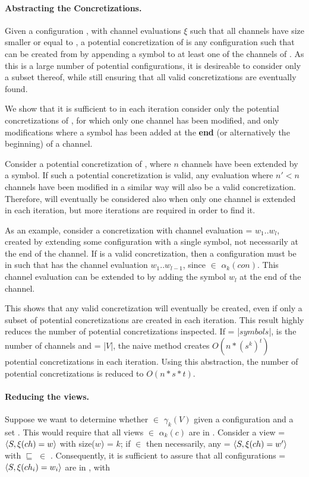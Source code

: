 \paragraph{Abstracting the Concretizations.}
Given a configuration , with channel evaluations $\xi$ such that all channels have size smaller or equal to , a potential concretization of  is any configuration  such that  can be created from  by appending a symbol to at least one of the channels of . As this is a large number of potential configurations, it is desireable to consider only a subset thereof, while still ensuring that all valid concretizations are eventually found.

We show that it is sufficient to in each iteration consider only the potential concretizations of , for which only one channel has been modified, and only modifications where a symbol has been added at the \textbf{end} (or alternatively the beginning) of a channel.

Consider a potential concretization  of , where $n$ channels have been extended by a symbol. If such a potential concretization is valid, any evaluation where $n'<n$ channels have been modified in a similar way will also be a valid concretization. Therefore,  will eventually be considered also when only one channel is extended in each iteration, but more iterations are required in order to find it.

As an example, consider a concretization with channel evaluation  = $w_1..w_l$, created by extending some configuration with a single symbol, not necessarily at the end of the channel. If  is a valid concretization, then a configuration  must be in  such that  has the channel evaluation $w_1..w_{l-1}$, since  $\in$ $\alpha_k(con)$. This channel evaluation can be extended to  by adding the symbol $w_l$ at the end of the channel.

This shows that any valid concretization will eventually be created, even if only a subset of potential concretizations are created in each iteration. This result highly reduces the number of potential concretizations inspected. If  = |$symbols$|,  is the number of channels and  = |$V$|, the naive method creates $O(n*(s^k)^t)$ potential concretizations in each iteration. Using this abstraction, the number of potential concretizations is reduced to $O(n*s*t)$.

\paragraph{Reducing the views.}
Suppose we want to determine whether  $\in$ $\gamma_k(V)$ given a configuration  and a set . This would require that all views  $\in$ $\alpha_k(c)$ are in . Consider a view  = $\langle S, \xi(ch)=w\rangle$ with size($w$) = $k$; if  $\in$  then necessarily, any  = $\langle S, \xi(ch)=w'\rangle$ with  $\sqsubseteq$  $\in$ . Consequently, it is sufficient to assure that all configurations  = $\langle S,\xi(ch_i)=w_i\rangle$ are in , with

